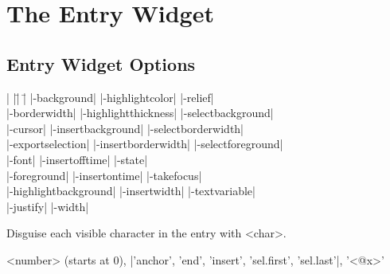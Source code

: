 
\section{The Entry Widget}

\subsection*{Entry Widget Options}
\begin{tabbing}
|                    |\=|                     |\= \kill
|-background|       \> |-highlightcolor|     \> |-relief| \\
|-borderwidth|      \> |-highlightthickness| \> |-selectbackground| \\             
|-cursor|	    \> |-insertbackground|   \> |-selectborderwidth| \\   
|-exportselection|  \> |-insertborderwidth|  \> |-selectforeground| \\  
|-font|             \> |-insertofftime|      \> |-state| \\   
|-foreground|       \> |-insertontime|       \> |-takefocus| \\       
|-highlightbackground| \> |-insertwidth|     \> |-textvariable| \\              
 \> |-justify| \> |-width| \\
\end{tabbing}

\vskip5pt
\begin{enum}{1cm}

Disguise each visible character in the entry with <char>.

\end{enum}
\begin{enum}{2.5cm}

<number> (starts at 0), |'anchor', 'end', 'insert', 'sel.first', 'sel.last'|, '<@x>'

\end{enum}

